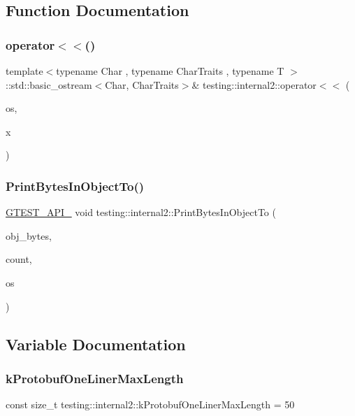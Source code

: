 \subsection{Function Documentation}
\mbox{\label{namespacetesting_1_1internal2_a07dbe129beb8952074f04b599dfce39b}} 
\subsubsection{\texorpdfstring{operator$<$$<$()}{operator<<()}}
{\footnotesize\ttfamily template$<$typename Char , typename Char\+Traits , typename T $>$ \\
\+::std\+::basic\+\_\+ostream$<$Char, Char\+Traits$>$\& testing\+::internal2\+::operator$<$$<$ (\begin{DoxyParamCaption}\item[{\+::std\+::basic\+\_\+ostream$<$ Char, Char\+Traits $>$ \&}]{os,  }\item[{const T \&}]{x }\end{DoxyParamCaption})}

\mbox{\label{namespacetesting_1_1internal2_a9fbf8e07c0f94dc74d6ef5e56cd3c553}} 
\subsubsection{\texorpdfstring{PrintBytesInObjectTo()}{PrintBytesInObjectTo()}}
{\footnotesize\ttfamily \mbox{\hyperlink{gtest-port_8h_aa73be6f0ba4a7456180a94904ce17790}{G\+T\+E\+S\+T\+\_\+\+A\+P\+I\+\_\+}} void testing\+::internal2\+::\+Print\+Bytes\+In\+Object\+To (\begin{DoxyParamCaption}\item[{const unsigned char $\ast$}]{obj\+\_\+bytes,  }\item[{size\+\_\+t}]{count,  }\item[{\+::std\+::ostream $\ast$}]{os }\end{DoxyParamCaption})}



\subsection{Variable Documentation}
\mbox{\label{namespacetesting_1_1internal2_a140c8efd51e63a3def98445bff107518}} 
\subsubsection{\texorpdfstring{kProtobufOneLinerMaxLength}{kProtobufOneLinerMaxLength}}
{\footnotesize\ttfamily const size\+\_\+t testing\+::internal2\+::k\+Protobuf\+One\+Liner\+Max\+Length = 50}

